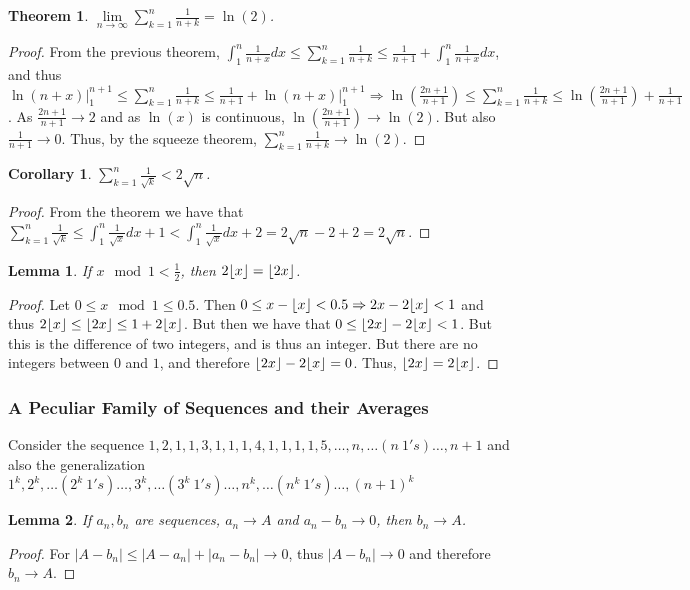 \documentclass[oneside]{book}
\theoremstyle{mystyle}
\newtheorem{theorem}{Theorem}[section]
\newtheorem{lemma}{Lemma}[section]
\newtheorem{corollary}{Corollary}[section]
\DeclarePairedDelimiter\floor{\lfloor}{\rfloor}
\begin{document}
\begin{theorem}
$\underset{n\rightarrow \infty}\lim \sum_{k=1}^{n} \frac{1}{n+k} = \ln(2)$.
\end{theorem}
\begin{proof}
From the previous theorem, $\int_{1}^{n} \frac{1}{n+x} dx \leq \sum_{k=1}^{n} \frac{1}{n+k} \leq \frac{1}{n+1} + \int_{1}^{n} \frac{1}{n+x}dx$, and thus $\ln(n+x)\big|_{1}^{n+1} \leq \sum_{k=1}^{n} \frac{1}{n+k}\leq \frac{1}{n+1}+\ln(n+x)\big|_{1}^{n+1}\Rightarrow \ln(\frac{2n+1}{n+1})\leq \sum_{k=1}^{n} \frac{1}{n+k} \leq \ln(\frac{2n+1}{n+1})+\frac{1}{n+1}$. As $\frac{2n+1}{n+1}\rightarrow 2$ and as $\ln(x)$ is continuous, $\ln(\frac{2n+1}{n+1})\rightarrow \ln(2)$. But also $\frac{1}{n+1}\rightarrow 0$. Thus, by the squeeze theorem, $\sum_{k=1}^{n} \frac{1}{n+k} \rightarrow \ln(2)$.
\end{proof}

\begin{corollary}
$\sum_{k=1}^{n}\frac{1}{\sqrt{k}}< 2\sqrt{n}$.
\end{corollary}
\begin{proof}
From the theorem we have that $\sum_{k=1}^{n} \frac{1}{\sqrt{k}} \leq \int_{1}^{n}\frac{1}{\sqrt{x}}dx + 1 < \int_{1}^{n} \frac{1}{\sqrt{x}}dx +2 = 2\sqrt{n}-2+2 = 2\sqrt{n}$.
\end{proof}

\begin{lemma}
If $x\mod 1 < \frac{1}{2}$, then $2\floor{x} = \floor{2x}$.
\end{lemma}
\begin{proof}
Let $0\leq x \mod 1 \leq 0.5$. Then $0 \leq x-\floor{x}<0.5 \Rightarrow 2x-2\floor{x} <1$ and thus $2\floor{x} \leq \floor{2x} \leq 1+2\floor{x}$. But then we have that $0 \leq \floor{2x}-2\floor{x} <1$. But this is the difference of two integers, and is thus an integer. But there are no integers between $0$ and $1$, and therefore $\floor{2x}-2\floor{x} = 0$. Thus, $\floor{2x}=2\floor{x}$.
\end{proof}

\subsubsection{A Peculiar Family of Sequences and their Averages}
%
Consider the sequence $1,2,1,1,3,1,1,1,4,1,1,1,1,5,\hdots, n,\hdots (n\ 1's)\hdots, n+1$ and also the generalization $1^k, 2^k,\hdots (2^k\ 1's)\hdots, 3^k, \hdots (3^k\ 1's)\hdots, n^k, \hdots (n^k\ 1's)\hdots, (n+1)^k$
%
\begin{lemma}
If $a_n, b_n$ are sequences, $a_n\rightarrow A$ and $a_n-b_n\rightarrow 0$, then $b_n \rightarrow A$.
\end{lemma}
\begin{proof}
For $|A-b_n| \leq |A-a_n|+|a_n-b_n| \rightarrow 0$, thus $|A-b_n|\rightarrow 0$ and therefore $b_n \rightarrow A$.
\end{proof}
\end{document}
